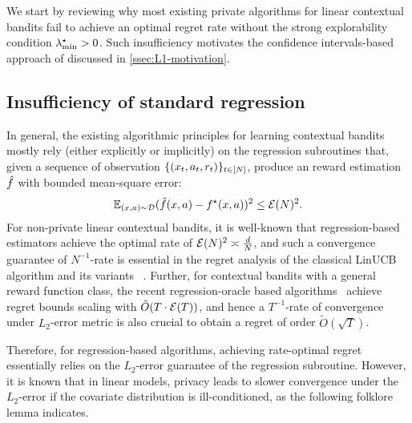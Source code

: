 
We start by reviewing why most existing private algorithms for linear contextual bandits fail to achieve an optimal regret rate without the strong explorability condition $\lambda_{\min}^\star>0$. Such insufficiency motivates the confidence intervals-based approach of \citet{li2024optimal} discussed in \cref{ssec:L1-motivation}.

\subsection{Insufficiency of standard regression}





In general, the existing algorithmic principles for learning contextual bandits mostly rely (either explicitly or implicitly) on the regression subroutines that, given a sequence of observation $\{(x_t,a_t,r_t)\}_{t\in[N]}$, produce an reward estimation $\hat{f}$ %
with bounded mean-square error:
\begin{align*}
    \mathbb{E}_{(x,a)\sim \mathcal{D}} (\hat{f}(x,a)-f^\star(x,a) )^2\leq \mathcal{E}(N)^2.
\end{align*}
For non-private linear contextual bandits, it is well-known that regression-based estimators achieve the optimal rate of $\mathcal{E}(N)^2\asymp \frac{d}{N}$, and such a convergence guarantee of $N^{-1}$-rate is essential in the regret analysis of the classical LinUCB algorithm and its variants ~\citep{abbasi2011improved,li2019nearly,bastani2020online}.
Further, for contextual bandits with a general reward function class,
the recent regression-oracle based algorithms~\citep{simchi2020bypassing, foster2020beyond} achieve regret bounds scaling with $\tilde{O}{\left( T\cdot \mathcal{E}(T) \right)}$, %
and hence a $T^{-1}$-rate of convergence under $L_2$-error metric is also crucial
to obtain a regret of order $\widetilde{O}(\sqrt{T})$.






\newcommand{\ellg}{\ell_{\link}}
\newcommand{\Errltwo}[1]{\mathsf{Err}_{2}(#1)}





Therefore, for regression-based algorithms, achieving rate-optimal regret essentially relies on the $L_2$-error guarantee of the regression subroutine.
However, it is known that in linear models, privacy leads to slower convergence under the $L_2$-error if the covariate distribution is ill-conditioned, as the following folklore lemma indicates.

